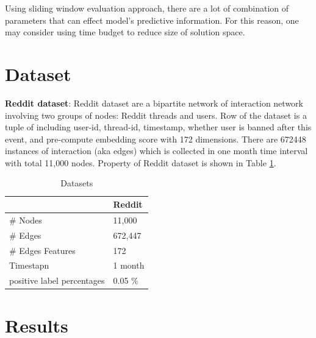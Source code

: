 \documentclass{IEEEtran}
\begin{document}
Using sliding window evaluation approach, there are a lot of combination of parameters that can effect model's predictive information. For this reason, one may consider using time budget to reduce size of solution space.
\section{Dataset}
\label{sec:orga5d606d}
\textbf{Reddit dataset}: Reddit dataset are a bipartite network of interaction network involving two groups of nodes: Reddit threads and users. Row of the dataset is a tuple of including user-id, thread-id, timestamp, whether user is banned after this event, and pre-compute embedding score with 172 dimensions. There are 672448 instances of interaction (aka edges) which is collected in one month time interval with total 11,000 nodes. Property of Reddit dataset is shown in Table \ref{Datasets}.

\begin{table}[htbp]
\caption{\label{Datasets}Datasets}
\centering
\begin{tabular}{ll}
\hline
\hline
 & Reddit\\
\hline
\# Nodes & 11,000\\
\# Edges & 672,447\\
\# Edges Features & 172\\
Timestapn & 1 month\\
positive label percentages & 0.05 \%\\
\end{tabular}
\end{table}
\section{Results}
\label{sec:org8247003}
\printbibliography
\end{document}

